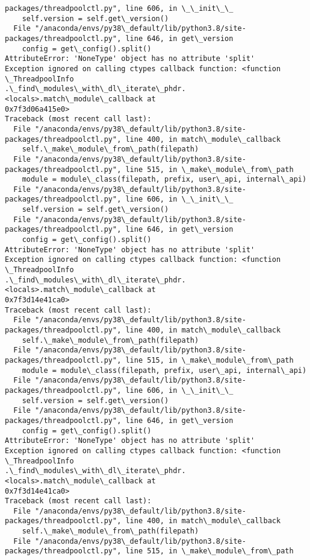 \documentclass[11pt]{article}
\begin{document}
\begin{Verbatim}[commandchars=\\\{\}]
packages/threadpoolctl.py", line 606, in \_\_init\_\_
    self.version = self.get\_version()
  File "/anaconda/envs/py38\_default/lib/python3.8/site-
packages/threadpoolctl.py", line 646, in get\_version
    config = get\_config().split()
AttributeError: 'NoneType' object has no attribute 'split'
Exception ignored on calling ctypes callback function: <function \_ThreadpoolInfo
.\_find\_modules\_with\_dl\_iterate\_phdr.<locals>.match\_module\_callback at
0x7f3d06a415e0>
Traceback (most recent call last):
  File "/anaconda/envs/py38\_default/lib/python3.8/site-
packages/threadpoolctl.py", line 400, in match\_module\_callback
    self.\_make\_module\_from\_path(filepath)
  File "/anaconda/envs/py38\_default/lib/python3.8/site-
packages/threadpoolctl.py", line 515, in \_make\_module\_from\_path
    module = module\_class(filepath, prefix, user\_api, internal\_api)
  File "/anaconda/envs/py38\_default/lib/python3.8/site-
packages/threadpoolctl.py", line 606, in \_\_init\_\_
    self.version = self.get\_version()
  File "/anaconda/envs/py38\_default/lib/python3.8/site-
packages/threadpoolctl.py", line 646, in get\_version
    config = get\_config().split()
AttributeError: 'NoneType' object has no attribute 'split'
Exception ignored on calling ctypes callback function: <function \_ThreadpoolInfo
.\_find\_modules\_with\_dl\_iterate\_phdr.<locals>.match\_module\_callback at
0x7f3d14e41ca0>
Traceback (most recent call last):
  File "/anaconda/envs/py38\_default/lib/python3.8/site-
packages/threadpoolctl.py", line 400, in match\_module\_callback
    self.\_make\_module\_from\_path(filepath)
  File "/anaconda/envs/py38\_default/lib/python3.8/site-
packages/threadpoolctl.py", line 515, in \_make\_module\_from\_path
    module = module\_class(filepath, prefix, user\_api, internal\_api)
  File "/anaconda/envs/py38\_default/lib/python3.8/site-
packages/threadpoolctl.py", line 606, in \_\_init\_\_
    self.version = self.get\_version()
  File "/anaconda/envs/py38\_default/lib/python3.8/site-
packages/threadpoolctl.py", line 646, in get\_version
    config = get\_config().split()
AttributeError: 'NoneType' object has no attribute 'split'
Exception ignored on calling ctypes callback function: <function \_ThreadpoolInfo
.\_find\_modules\_with\_dl\_iterate\_phdr.<locals>.match\_module\_callback at
0x7f3d14e41ca0>
Traceback (most recent call last):
  File "/anaconda/envs/py38\_default/lib/python3.8/site-
packages/threadpoolctl.py", line 400, in match\_module\_callback
    self.\_make\_module\_from\_path(filepath)
  File "/anaconda/envs/py38\_default/lib/python3.8/site-
packages/threadpoolctl.py", line 515, in \_make\_module\_from\_path

\end{Verbatim}
\end{document}
